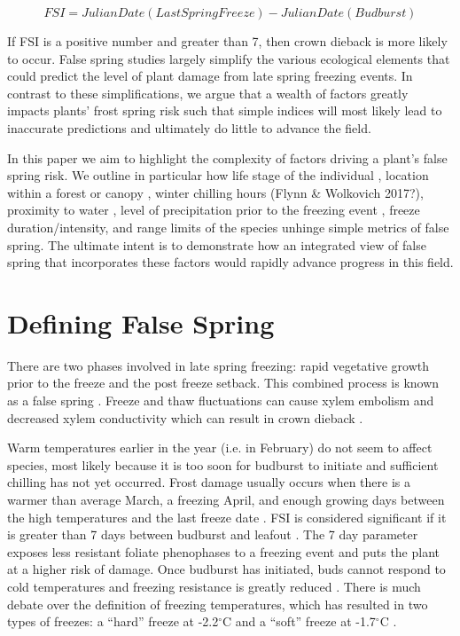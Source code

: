 \documentclass{article}\usepackage[]{graphicx}\usepackage[]{color}
\begin{document}
\[ FSI = Julian Date (Last Spring Freeze) - Julian Date (Budburst) \]

If FSI is a positive number and greater than 7, then crown dieback is more likely to occur. False spring studies largely simplify the various ecological elements that could predict the level of plant damage from late spring freezing events. In contrast to these simplifications, we argue that a wealth of factors greatly impacts plants' frost spring risk such that simple indices will most likely lead to inaccurate predictions and ultimately do little to advance the field. 

In this paper we aim to highlight the complexity of factors driving a plant's false spring risk. We outline in particular how life stage of the individual \citep{Caffarra2011}, location within a forest or canopy \citep{Augspurger2013}, winter chilling hours (Flynn \& Wolkovich 2017?), proximity to water \citep{Gu2008}, level of precipitation prior to the freezing event \citep{Anderegg2013}, freeze duration/intensity, and range limits of the species \citep{Martin2010} unhinge simple metrics of false spring. The ultimate intent is to demonstrate how an integrated view of false spring that incorporates these factors would rapidly advance progress in this field.  

\section{Defining False Spring}
There are two phases involved in late spring freezing: rapid vegetative growth prior to the freeze and the post freeze setback. This combined process is known as a false spring \citep{Gu2008}. Freeze and thaw fluctuations can cause xylem embolism and decreased xylem conductivity which can result in crown dieback \citep{Gu2008}.

Warm temperatures earlier in the year (i.e. in February) do not seem to affect species, most likely because it is too soon for budburst to initiate and sufficient chilling has not yet occurred. Frost damage usually occurs when there is a warmer than average March, a freezing April, and enough growing days between the high temperatures and the last freeze date \citep{Augspurger2013}. 
FSI is considered significant if it is greater than 7 days between budburst and leafout \citep{Peterson2014}. The 7 day parameter exposes less resistant foliate phenophases to a freezing event and puts the plant at a higher risk of damage. Once budburst has initiated, buds cannot respond to cold temperatures and freezing resistance is greatly reduced \citep{Vitasse2014, Lenz2013, Taschler2004}. There is much debate over the definition of freezing temperatures, which has resulted in two types of freezes: a ``hard'' freeze at -2.2$^{\circ}$C and a ``soft'' freeze at -1.7$^{\circ}$C \citep{Augspurger2013, Kodra2011, Vavrus2006}.
\end{document}
